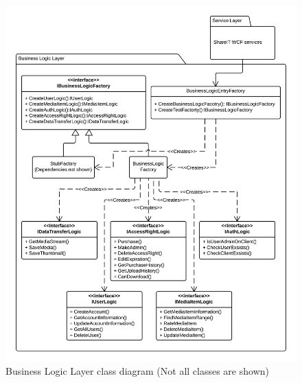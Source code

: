 \documentclass[../report.tex]{subfiles}
\begin{document}
\begin{figure}
\centering
\includegraphics[width=\linewidth]{BLLclassdiagram.png}
\caption{Business Logic Layer class diagram (Not all classes are shown)}
\label{fig:BLLclassdiagram}
\end{figure}
\end{document}
